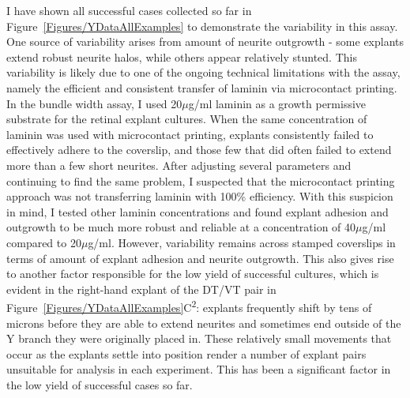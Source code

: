 I have shown all successful cases collected so far in Figure~\ref{Figures/YDataAllExamples} to demonstrate the variability in this assay.
One source of variability arises from amount of neurite outgrowth - some explants extend robust neurite halos, while others appear relatively stunted.
This variability is likely due to one of the ongoing technical limitations with the assay, namely the efficient and consistent transfer of laminin via microcontact printing.
In the bundle width assay, I used 20$\mu$g/ml laminin as a growth permissive substrate for the retinal explant cultures.
When the same concentration of laminin was used with microcontact printing, explants consistently failed to effectively adhere to the coverslip, and those few that did often failed to extend more than a few short neurites.
After adjusting several parameters and continuing to find the same problem, I suspected that the microcontact printing approach was not transferring laminin with 100\% efficiency.
With this suspicion in mind, I tested other laminin concentrations and found explant adhesion and outgrowth to be much more robust and reliable at a concentration of 40$\mu$g/ml compared to 20$\mu$g/ml.
However, variability remains across stamped coverslips in terms of amount of explant adhesion and neurite outgrowth.
This also gives rise to another factor responsible for the low yield of successful cultures, which is evident in the right-hand explant of the DT/VT pair in Figure~\ref{Figures/YDataAllExamples}C\textsuperscript{2}: explants frequently shift by tens of microns before they are able to extend neurites and sometimes end outside of the Y branch they were originally placed in.
These relatively small movements that occur as the explants settle into position render a number of explant pairs unsuitable for analysis in each experiment.
This has been a significant factor in the low yield of successful cases so far.

